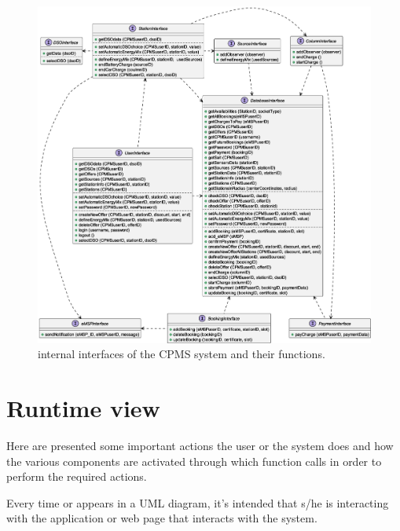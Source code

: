 \begin{figure}[h!]
    \centering
    \includegraphics[width=\columnwidth]{./images/interfaces/cpms}
    \caption{internal interfaces of the CPMS system and their functions.}
    \label{figure:interface:cpms}
\end{figure}

\pagebreak

\section{Runtime view} \label{view:runtime}

Here are presented some important actions the user or the system does and how the various components are activated through which function calls in order to perform the required actions.\medskip

Every time  or  appears in a UML diagram, it's intended that s/he is interacting with the application or web page that interacts with the system.\medskip

